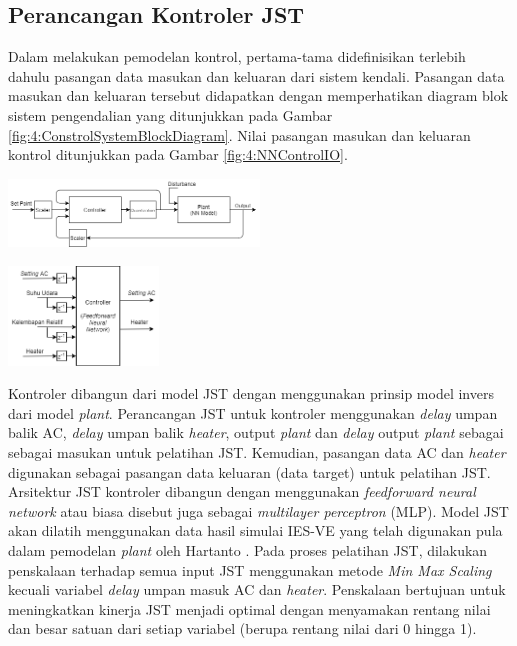 \documentclass[a4paper,10pt]{article}
\makeatletter
\newenvironment{body}{\begin{multicols}{2}}{\end{multicols}}
\renewenvironment{figure}
{\def\@captype{figure}%
	\captionsetup{labelsep=period,format=hang,font=footnotesize,justification=justified}
}
{}
\makeatother
\begin{document}
\begin{body}
		\subsection{Perancangan Kontroler JST}
		
		Dalam melakukan pemodelan kontrol, pertama-tama didefinisikan terlebih dahulu pasangan data masukan dan keluaran dari sistem kendali. Pasangan data masukan dan keluaran tersebut didapatkan dengan memperhatikan diagram blok sistem pengendalian yang ditunjukkan pada Gambar \ref{fig:4:ConstrolSystemBlockDiagram}. Nilai pasangan masukan dan keluaran kontrol ditunjukkan pada Gambar \ref{fig:4:NNControlIO}.\\
		
		\begin{figure}
			\centering
			\includegraphics[width=0.5\textwidth]{figures/ControlDesignDiagramII}
			\caption{Diagram blok sistem kontrol berbasis JST\cite{paper42Paisan}}
			\label{fig:4:ConstrolSystemBlockDiagram}
		\end{figure}
		
		\begin{figure}
			\centering
			\includegraphics[width=0.3\textwidth]{figures/NNControllerIO}
			\caption{Pasangan masukan dan keluaran model JST kontroler}
			\label{fig:4:NNControlIO}
		\end{figure}
		
		\vspace{1mm}
		
		Kontroler dibangun dari model JST dengan menggunakan prinsip model invers dari model \textit{plant}. Perancangan JST untuk kontroler menggunakan \textit{delay} umpan balik AC, \textit{delay} umpan balik \textit{heater}, output \textit{plant} dan \textit{delay} output \textit{plant} sebagai sebagai masukan untuk pelatihan JST. Kemudian, pasangan data AC dan \textit{heater} digunakan sebagai pasangan data keluaran (data target) untuk pelatihan JST. Arsitektur JST kontroler dibangun dengan menggunakan \textit{feedforward neural network} atau biasa disebut juga sebagai \textit{multilayer perceptron} (MLP). Model JST akan dilatih menggunakan data hasil simulai IES-VE yang telah digunakan pula dalam pemodelan \textit{plant} oleh Hartanto \cite{skripsiTanto}. Pada proses pelatihan JST, dilakukan penskalaan terhadap semua input JST menggunakan metode \textit{Min Max Scaling} kecuali variabel \textit{delay} umpan masuk AC dan \textit{heater}. Penskalaan bertujuan untuk meningkatkan kinerja JST menjadi optimal dengan menyamakan rentang nilai dan besar satuan dari setiap variabel (berupa rentang nilai dari 0 hingga 1).
		

\end{body}
\end{document}
